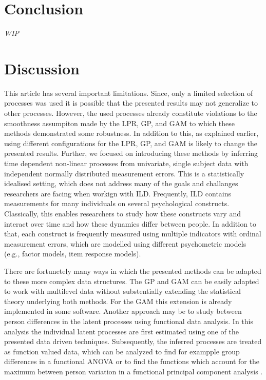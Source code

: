 \documentclass[man, floatsintext]{apa7}
\begin{document}
\section{Conclusion}

\textit{WIP}

\section{Discussion}


This article has several important limitations. Since, only a
limited selection of processes was used it is possible that the presented
results may not generalize to other processes. However, the used processes
already constitute violations to the smoothness assumpiton made by the
LPR, GP, and GAM to which these methods demonstrated some robustness. In
addition to this, as explained earlier, using different configurations for
the LPR, GP, and GAM is likely to change the presented results. Further,
we focused on introducing these methods by inferring time dependent
non-linear processes from univariate, single subject data with independent
normally distributed measurement errors. This is a statistically idealised
setting, which does not address many of the goals and challanges researchers
are facing when workign with ILD\@. Frequently, ILD contains measurements
for many individuals on several psychological constructs. Classically, this
enables researchers to study how these constructs vary and interact over time
and how these dynamics differ between people. In addition to that, each
construct is frequently measured using multiple indicators with ordinal
measurement errors, which are modelled using different psychometric models
(e.g., factor models, item response models).

There are fortunetely many ways in which the presented methods can be adapted
to
these more complex data structures. The GP and GAM can be easily adapted
to work with multilevel data without substentially extending the statistical
theory underlying both methods. For the GAM this extension is already
implemented in some software. Another approach may be to study between
person differences in the latent processes using functional data analysis.
In this analysis
the individual latent processes are first estimated using one of the presented
data driven techniques. Subsequently, the inferred processes are treated as
function valued data, which can be analyzed to find for exampple group
differences in a functional ANOVA \parencite{kaufman_bayesian_2010} or
to find the functions which account for the maximum between person variation
in a functional principal component analysis \parencite{aue_prediction_2015}.
\end{document}
